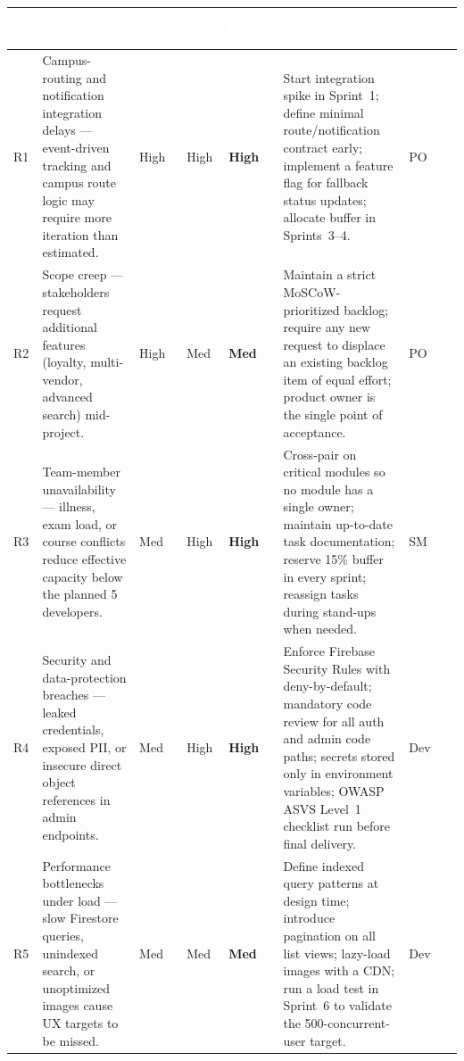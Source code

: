 \documentclass[11pt,a4paper]{article}
\begin{document}
\renewcommand{\arraystretch}{1.2}
\begin{table}[H]
\centering
\footnotesize
\begin{tabular}{|p{}|p{}|p{}|p{}|p{}|p{}|p{}|}
\hline
\rowcolor{aybuHeader}
\textcolor{white}{\textbf{ID}} &
\textcolor{white}{\textbf{Risk Description}} &
\textcolor{white}{\textbf{Prob.}} &
\textcolor{white}{\textbf{Imp.}} &
\textcolor{white}{\textbf{Expos.}} &
\textcolor{white}{\textbf{Mitigation Strategy}} &
\textcolor{white}{\textbf{Owner}} \\ \hline
 
R1 & Campus-routing and notification integration delays ---
event-driven tracking and campus route logic may require more iteration
than estimated. & High & High &
\cellcolor{riskHigh}\textbf{High} & Start integration spike in
Sprint~1; define minimal route/notification contract early; implement a
feature flag for fallback status updates; allocate buffer in
Sprints~3--4. & PO \\ \hline
 
R2 & Scope creep --- stakeholders request additional features
(loyalty, multi-vendor, advanced search) mid-project. & High & Med &
\cellcolor{riskMed}\textbf{Med} & Maintain a strict MoSCoW-prioritized
backlog; require any new request to displace an existing backlog item
of equal effort; product owner is the single point of acceptance. &
PO \\ \hline
 
R3 & Team-member unavailability --- illness, exam load, or course
conflicts reduce effective capacity below the planned 5 developers. &
Med & High & \cellcolor{riskHigh}\textbf{High} & Cross-pair on critical
modules so no module has a single owner; maintain up-to-date task
documentation; reserve 15\% buffer in every sprint; reassign tasks
during stand-ups when needed. & SM \\ \hline
 
R4 & Security and data-protection breaches --- leaked credentials,
exposed PII, or insecure direct object references in admin endpoints.
& Med & High & \cellcolor{riskHigh}\textbf{High} & Enforce Firebase
Security Rules with deny-by-default; mandatory code review for all
auth and admin code paths; secrets stored only in environment
variables; OWASP ASVS Level~1 checklist run before final delivery. &
Dev \\ \hline
 
R5 & Performance bottlenecks under load --- slow Firestore queries,
unindexed search, or unoptimized images cause UX targets to be missed.
& Med & Med & \cellcolor{riskMed}\textbf{Med} & Define indexed query
patterns at design time; introduce pagination on all list views;
lazy-load images with a CDN; run a load test in Sprint~6 to validate
the 500-concurrent-user target. & Dev \\ \hline
 

\end{tabular}
\end{table}
\end{document}
